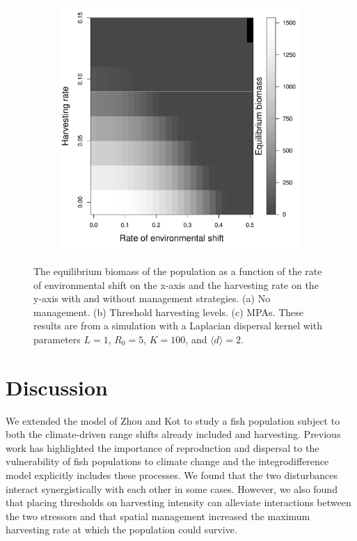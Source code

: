 \documentclass[]{article}
\begin{document}
\begin{figure}[htbp]
\begin{subfigure}{.33\textwidth}
\end{subfigure}
\begin{subfigure}{.33\textwidth}
\subcaption{}
\includegraphics[width=\textwidth]{plots/eqbiomass_mpa.pdf}
\end{subfigure}
\caption{The equilibrium biomass of the population as a function of the rate of environmental shift on the x-axis and the harvesting rate on the y-axis with and without management strategies.  (a) No management.  (b) Threshold harvesting levels.  (c) MPAs.  These results are from a simulation with a Laplacian dispersal kernel with parameters $L=1$, $R_0=5$, $K=100$, and $\langle d \rangle =2$. }
\label{thresholds}
\end{figure}


\section{Discussion}

We extended the model of Zhou and Kot \citep{ZhouKot2011} to study a fish population subject to both the climate-driven range shifts already included and harvesting. Previous work has highlighted the importance of 
reproduction and dispersal to the vulnerability of fish populations to climate change \citep[\citet{Fordhametal2013}]
{Hastingsetal2005} and the integrodifference model explicitly includes these processes. We found that 
the two disturbances interact synergistically with each other in some cases. However, we also found that 
placing thresholds on harvesting intensity can alleviate interactions between the two stressors and that spatial 
management increased the maximum harvesting rate at which the population could survive.
\end{document}
